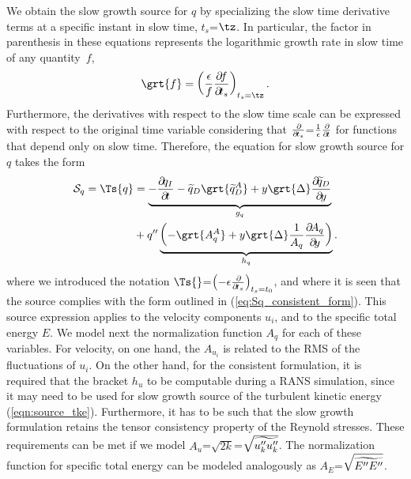 {%
We obtain the slow growth source for $q$ by specializing the slow time
derivative terms at a specific instant in slow time, $t_s$=$\tz$.
%
In particular, the factor in parenthesis in these equations represents the
logarithmic growth rate in slow time of any quantity~$f$,
%
\begin{equation}
\grt{f} =
\left( \frac{\epsilon}{f} \pp{f}{t_s} \right)_{t_s=\tz}.
\end{equation}
%
Furthermore, the derivatives with respect to the slow time scale can be
expressed with respect to the original time variable considering that
$\frac{\partial\!{}}{\partial\!{t_s}}$=$\frac{1}{\epsilon} \frac{\partial\!{}}{\partial\!{t}}$ for functions that depend only on
slow time.
Therefore, the equation for slow growth source for $q$ takes the form
%
%
\begin{align}
\label{eqn:slowGrowth_q}
\Ssd_{q} = \Ts{q} &=
\underbrace{%
       - \pp{q_I}{t}
       -\fav{q}_D
          \grt{\fav{q}_D^A}
      + y \grt{\Delta}
             \pp{\fav{q}_D}{y}
}_{g_q}
\\\notag
     &+ \ffluc{q}
\underbrace{%
       \left(
	 - \grt{A_q^A}
      + y \grt{\Delta}
             \frac{1}{A_{q}} \pp{A_{q}}{y}
         \right)
}_{h_q}.
\end{align}
%
where we introduced the notation
$\Ts{}$=$\left(-\epsilon \frac{\partial\!{}}{\partial\!{t_s}}\right)_{t_s=t_0}$, and
where it is seen that the source complies with the form outlined in
(\ref{eq:Sq_consistent_form}).
%
This source expression applies to the velocity components $u_i$, and to the
specific total energy $E$.
%
We model next the normalization function $A_q$ for each of these variables.
%
For velocity, on one hand, the $A_{u_i}$ is related to the RMS of the
fluctuations of $u_i$.
%
On the other hand, for the consistent formulation, it is required that the
bracket $h_u$ to be computable during a RANS simulation, since it may need to be
used for slow growth source of the turbulent kinetic energy
(\ref{eqn:source_tke}).
%
Furthermore, it has to be such that the slow growth formulation retains the
tensor consistency property of the Reynold stresses.
%
These requirements can be met if we model
$A_u$=$\sqrt{2k}$=$\sqrt{\widetilde{u_k'' u_k''}}$.
%
The normalization function for specific total energy can be modeled analogously
as $A_E$=$\sqrt{\widetilde{E'' E''}}$.

}

